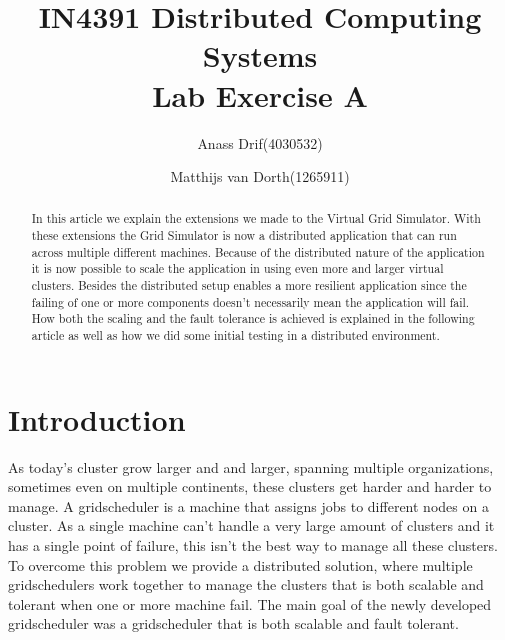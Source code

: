 \documentclass[twocolumn,a4paper]{article}
\title{\textbf{IN4391 Distributed Computing Systems \\ Lab Exercise A}}
\author{Anass Drif(4030532) \and Matthijs van Dorth(1265911)}
\begin{document}
\maketitle


\begin{abstract}
In this article we explain the extensions we made to the Virtual Grid Simulator. With these extensions the Grid Simulator is now a distributed application that can run across multiple different machines. Because of the distributed nature of the application it is now possible to scale the application in using even more and larger virtual clusters. Besides the distributed setup enables a more resilient application since the failing of one or more components doesn't necessarily mean the application will fail. How both the scaling and the fault tolerance is achieved is explained in the following article as well as how we did some initial testing in a distributed environment.
\end{abstract}

\section{Introduction}
As today's cluster grow larger and and larger, spanning multiple organizations, sometimes even on multiple continents, these clusters get harder and harder to manage. A gridscheduler is a machine that assigns jobs to different nodes on a cluster. As a single machine can't handle a very large amount of clusters and it has a single point of failure, this isn't the best way to manage all these clusters. To overcome this problem we provide a distributed solution, where multiple gridschedulers work together to manage the clusters that is both scalable and tolerant when one or more machine fail. The main goal of the newly developed gridscheduler was a gridscheduler that is both scalable and fault tolerant. 
\end{document}

